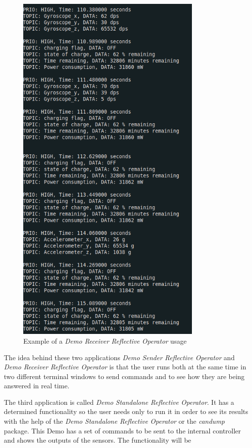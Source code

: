 \documentclass[12pt]{report}%
\begin{document}
\begin{figure}[ht]
 \centering
 \includegraphics[width=\textwidth, height=18cm]{receiver_example}
		\caption{Example of a \textit{Demo Receiver Reflective Operator} usage}
		\label{fig:receiver1}
\end{figure}

The idea behind these two applications \textit{Demo Sender Reflective Operator} and \textit{Demo Receiver Reflective Operator} is that the user runs both at the same time in two different terminal windows to send commands and to see how they are being answered in real time.

The third application is called \textit{Demo Standalone Reflective Operator}. It has a determined functionality so the user needs only to run it in order to see its results with the help of the \textit{Demo Standalone Reflective Operator} or the \textit{candump} package. This Demo has a set of commands to be sent to the internal controller and shows the outputs of the sensors. The functionality will be
\end{document}
